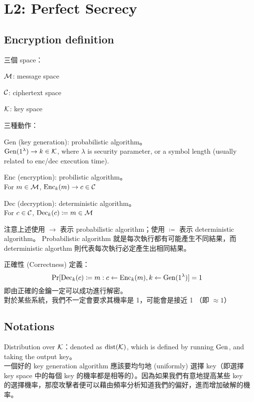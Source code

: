 \section{L2: Perfect Secrecy}


\subsection{Encryption definition}

三個 space：
\begin{myItemize}
	\item \(\operatorname{\mathcal{M}}\): message space
	\item \(\operatorname{\mathcal{C}}\): ciphertext space
	\item \(\operatorname{\mathcal{K}}\): key space
\end{myItemize}

三種動作：
\begin{myItemize}[itemsep=10pt]
	\item Gen (key generation): probabilistic algorithm。 \\
		\(\operatorname{Gen}(1^\lambda) \rightarrow k \in \operatorname{\mathcal{K}}\), where \(\lambda\) is security parameter, or a symbol length (usually related to enc/dec execution time).
	\item Enc (encryption): probilistic algorithm。 \\
		For \(m \in \operatorname{\mathcal{M}}\), \(\operatorname{Enc}_{k}(m) \rightarrow c \in \operatorname{\mathcal{C}}\)
	\item Dec (decryption): deterministic algorithm。 \\
		For \(c \in \operatorname{\mathcal{C}}\), \(\operatorname{Dec}_{k}(c) \coloneqq m \in \operatorname{\mathcal{M}}\)
\end{myItemize}

注意上述使用 \(\rightarrow\) 表示 probabilistic algorithm；使用 \(\coloneqq\) 表示 deterministic algorithm。
Probabilistic algorithm 就是每次執行都有可能產生不同結果，而 deterministic algorthm 則代表每次執行必定產生出相同結果。

正確性 (Correctness) 定義： \\
\[\Pr[ \operatorname{Dec}_{k}(c) \coloneqq m : c \leftarrow \operatorname{Enc}_{k}(m), k \leftarrow \operatorname{Gen}(1^\lambda) ] = 1\]
即由正確的金鑰一定可以成功進行解密。 \\
對於某些系統，我們不一定會要求其機率是 1，可能會是接近 1 （即 \( \approx 1\)）


\subsection{Notations}

Distribution over \(\operatorname{\mathcal{K}}\)：denoted as \(\operatorname{dist}(\operatorname{\mathcal{K}})\), which is defined by running \(\operatorname{Gen}\), and taking the output key。 \\
一個好的 key generation algorithm 應該要均勻地 (uniformly) 選擇 key（即選擇 key space 中的每個 key 的機率都是相等的）。因為如果我們有意地提高某些 key 的選擇機率，那麼攻擊者便可以藉由頻率分析知道我們的偏好，進而增加破解的機率。

